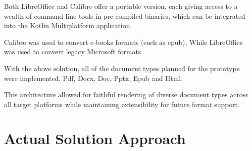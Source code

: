 \begin{enumerate}
                Both LibreOffice and Calibre offer a portable version, each giving access to a wealth of command line tools in pre-compiled binaries, which can be integrated into the Kotlin Multiplatform application. 
                
                Calibre was used to convert e-books formats (such as epub), While LibreOffice was used to convert legacy Microsoft formats. 
    
            \end{enumerate}
    
    
            With the above solution, all of the document types planned for the prototype were implemented. Pdf, Docx, Doc, Pptx, Epub and Html. 

            This architecture allowed for faithful rendering of diverse document types across all target platforms while maintaining extensibility for future format support.
    



\section{Actual Solution Approach}
\label{sec:actual_solution}

